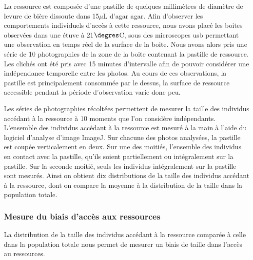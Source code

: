 La ressource est composée d'une pastille de quelques
millimètres de diamètre de levure de bière dissoute dans 15$\mu$L d'agar
agar. Afin d'observer les comportements individuels d'accès à cette ressource,
nous avons placé les boites observées dans une étuve à 21$\degres$C, sous des
microscopes usb permettant une observation en temps réel de la surface de la
boite. Nous avons alors pris une série de 10 photographies de la zone de la
boite contenant la pastille de ressource. Les clichés ont été pris avec 15
minutes d'intervalle afin de pouvoir considérer une indépendance temporelle
entre les photos. Au cours de ces observations, la pastille est
principalement consommée par le dessus, la surface de ressource accessible
pendant la période d'observation varie donc peu. 

Les séries de photographies récoltées permettent de mesurer la taille des
individus accédant à la ressource à 10 moments que l'on considère indépendants.
L'ensemble des individus accédant à la ressource est mesuré à la main à l'aide
du logiciel d'analyse d'image ImageJ. Sur chacune des photos analysées, la
pastille est coupée verticalement en deux. Sur une des moitiés, l'ensemble des
individus en contact avec la pastille, qu'ils soient partiellement ou
intégralement sur la pastille. Sur la seconde moitié, seuls les individus
intégralement sur la pastille sont mesurés. Ainsi on obtient dix distributions
de la taille des individus accédant à la ressource, dont on compare la moyenne à
la distribution de la taille dans la population totale.

\subsubsection{Mesure du biais d'accès aux ressources}

La distribution de la taille des individus accédant à la ressource comparée à
celle dans la population totale nous permet de mesurer un biais de taille dans
l'accès au ressources. 

